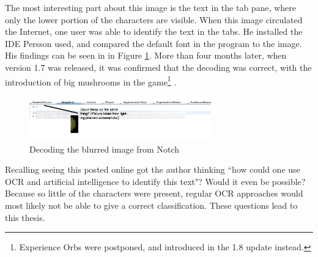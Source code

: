 The most interesting part about this image is the text in the tab pane, where only the lower portion of the characters are visible. When this image circulated the Internet, one user was able to identify the text in the tabs. He installed the \gls{IDE} Persson used, and compared the default font in the program to the image. His findings can be seen in in Figure \ref{fig:notch_eclipse_decoded}. More than four months later, when version 1.7 was released, it was confirmed that the decoding was correct, with the introduction of big mushrooms in the game\footnote{Experience Orbs were postponed, and introduced in the 1.8 update instead.} \cite{misc-minecraft.172-changelog}.

\begin{figure}[ht]
    \centering
    \includegraphics[width=0.7\textwidth]{fig/chapter1/notch_eclipse_decoded.png}
    \caption{Decoding the blurred image from Notch}
    \label{fig:notch_eclipse_decoded}
\end{figure}

Recalling seeing this posted online got the author thinking ``how could one use OCR and artificial intelligence to identify this text"? Would it even be possible? Because so little of the characters were present, regular OCR approaches would most likely not be able to give a correct classification. These questions lead to this thesis.
